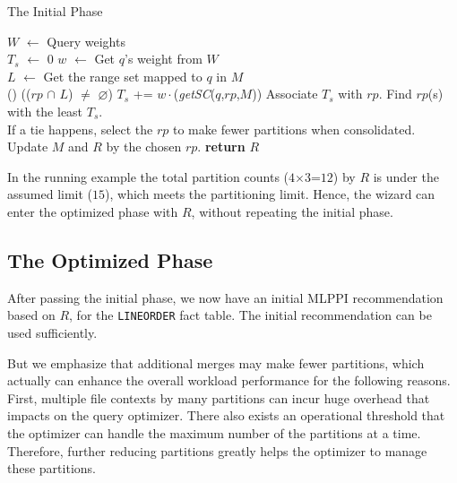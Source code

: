 \documentclass[runningheads]{comsis2}
\begin{document}
\begin{algorithm}[t]
\caption{The Initial Phase}
\label{algo:init_phase}
{
	$W$ $\leftarrow$ Query weights \\
	{
		{	 
			$T_{s}$ $\leftarrow$ 0 \;
			{	
				$w$ $\leftarrow$ Get $q$'s weight from $W$ \\
				$L$ $\leftarrow$ Get the range set mapped to $q$ in $M$ \\
				\uIf() {(($rp$ $\cap$ $L$) $\neq$ $\varnothing$)}
				{
					$T_{s}$ += $w{\cdot}$({\it getSC}($q$,$rp$,$M$)) 
				}
			}
			Associate $T_{s}$ with $rp$.
		}
		Find $rp$(s) with the least $T_{s}$. \\
		If a tie happens, select the $rp$ to make fewer partitions when consolidated. \\
		Update $M$ and $R$ by the chosen $rp$.
	}
	{\bf return} $R$\;
}
\end{algorithm}



In the running example the total partition counts ($4${$\times$}$3$=$12$) by $R$ is under 
the assumed limit ($15$), which meets the partitioning limit. 
Hence, the wizard can enter the optimized phase with $R$, 
without repeating the initial phase. 

\subsection{The Optimized Phase}
\label{sec:opt_phase}

After passing the initial phase, 
we now have an initial MLPPI recommendation based on $R$, for the {\tt LINEORDER} fact table.
The initial recommendation can be used sufficiently. 

But we emphasize that additional merges may make fewer partitions, 
which actually can enhance the overall workload performance for the following reasons. 
First, multiple file contexts by many partitions can incur 
huge overhead that impacts on the query optimizer. 
There also exists an operational threshold 
that the optimizer can handle the maximum number of the partitions at a time.
Therefore, further reducing partitions greatly helps the optimizer to manage these partitions.
\end{document}

